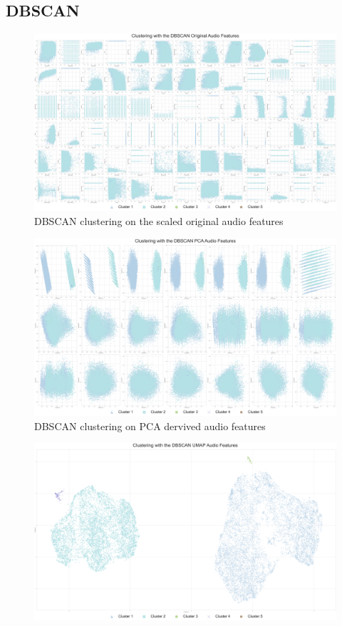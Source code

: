 \begin{appendix}
\subsection{DBSCAN}
\begin{figure}[htp]
    \centering
    \includegraphics[scale=0.09]{Outputs/DBSCAN Clustering - Original Audio Features.png}
    \caption{DBSCAN clustering on the scaled original audio features}
    \label{fig:dbscan-first}
\end{figure}
\begin{figure}[!htb]
    \centering
    \includegraphics[scale=0.09]{Outputs/DBSCAN Clustering - PCA Audio Features.png}
    \caption{DBSCAN clustering on PCA dervived audio features}
    \label{fig:dbscan-second}
\end{figure}
\begin{figure}
    \centering
    \includegraphics[scale=0.08]{Outputs/DBSCAN Clustering - UMAP Audio Features.png}

\end{figure}
\end{appendix}
